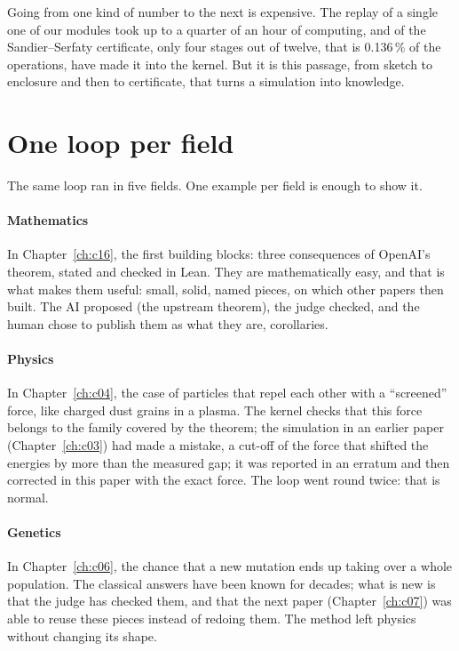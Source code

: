 Going from one kind of number to the next is expensive. The replay of a single one of our modules took up to a quarter
of an hour of computing, and of the Sandier--Serfaty certificate, only four stages out of twelve, that is 0.136\,\% of the
operations, have made it into the kernel. But it is
this passage, from sketch to enclosure and then to certificate, that turns a simulation into knowledge.

\section{One loop per field}

The same loop ran in five fields. One example per field is enough to show it.

\paragraph{Mathematics} In Chapter~\ref{ch:c16}, the first building blocks: three consequences of OpenAI's theorem,
stated and checked in Lean. They are mathematically easy, and that is what makes them useful: small, solid, named
pieces, on which other papers then built. The AI proposed (the upstream theorem), the judge checked, and the human
chose to publish them as what they are, corollaries.

\paragraph{Physics} In Chapter~\ref{ch:c04}, the case of particles that repel each other with a ``screened'' force,
like charged dust grains in a plasma. The kernel checks that this force belongs to the family covered by the theorem;
the simulation in an earlier paper (Chapter~\ref{ch:c03}) had made a mistake, a cut-off of the force that shifted the
energies by more than the measured gap; it was reported in an erratum and then corrected in this paper with the exact
force. The loop went round twice: that is normal.

\paragraph{Genetics} In Chapter~\ref{ch:c06}, the chance that a new mutation ends up taking over a whole population.
The classical answers have been known for decades; what is new is that the judge has checked them, and that the next
paper (Chapter~\ref{ch:c07}) was able to reuse these pieces instead of redoing them. The method left physics without
changing its shape.

